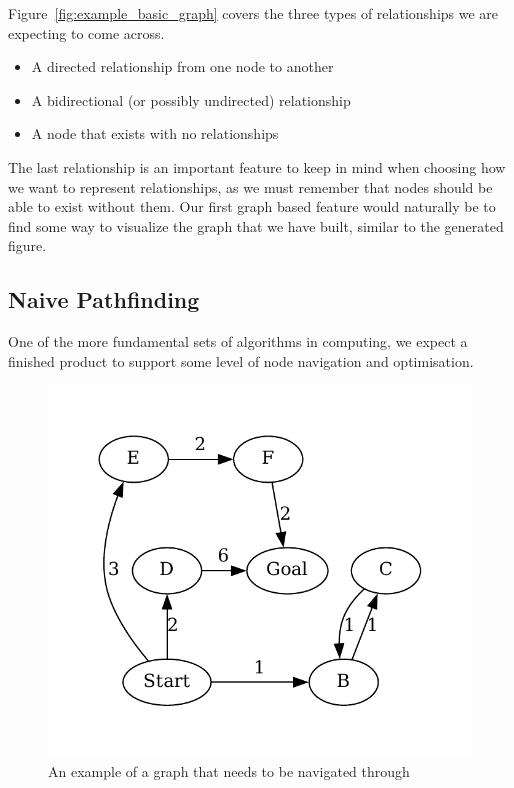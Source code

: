 Figure~\ref{fig:example_basic_graph} covers the three types of relationships we are expecting to come across.
\begin{itemize}
    \item A directed relationship from one node to another
    \item A bidirectional (or possibly undirected) relationship
    \item A node that exists with no relationships
\end{itemize}
The last relationship is an important feature to keep in mind when choosing how we want to represent relationships, as
we must remember that nodes should be able to exist without them.
Our first graph based feature would naturally be to find some way to visualize the graph that we have built, similar to
the generated figure.

\subsection{Naive Pathfinding}\label{subsec:naive-pathfinding}
One of the more fundamental sets of algorithms in computing, we expect a finished product to support some level of node
navigation and optimisation.

\begin{figure}[H]
    \centering
    \includegraphics[width=12cm]{figures/example_graphs/pathfinding.gv}
    \caption{An example of a graph that needs to be navigated through}
    \label{fig:example_pathfinding_graph}
\end{figure}

